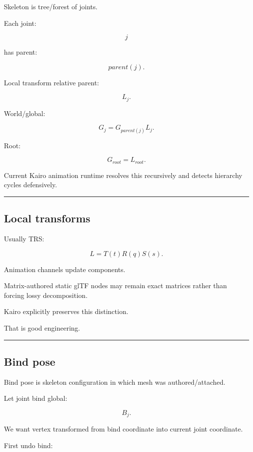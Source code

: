 Skeleton is tree/forest of joints.

Each joint:

\[
j
\]

has parent:

\[
parent(j).
\]

Local transform relative parent:

\[
L_j.
\]

World/global:

\[
\boxed{
G_j
=
G_{parent(j)}
L_j.
}
\]

Root:

\[
G_{root}=L_{root}.
\]

Current Kairo animation runtime resolves this recursively and detects hierarchy cycles defensively.

\begin{center}\rule{0.5\linewidth}{0.5pt}\end{center}

\subsection{Local transforms}\label{04-visual-computing-ii-ch041-local-transforms}

Usually TRS:

\[
L=
T(t)
R(q)
S(s).
\]

Animation channels update components.

Matrix-authored static glTF nodes may remain exact matrices rather than forcing lossy decomposition.

Kairo explicitly preserves this distinction.

That is good engineering.

\begin{center}\rule{0.5\linewidth}{0.5pt}\end{center}

\subsection{Bind pose}\label{04-visual-computing-ii-ch041-bind-pose}

Bind pose is skeleton configuration in which mesh was authored/attached.

Let joint bind global:

\[
B_j.
\]

We want vertex transformed from bind coordinate into current joint coordinate.

First undo bind:

